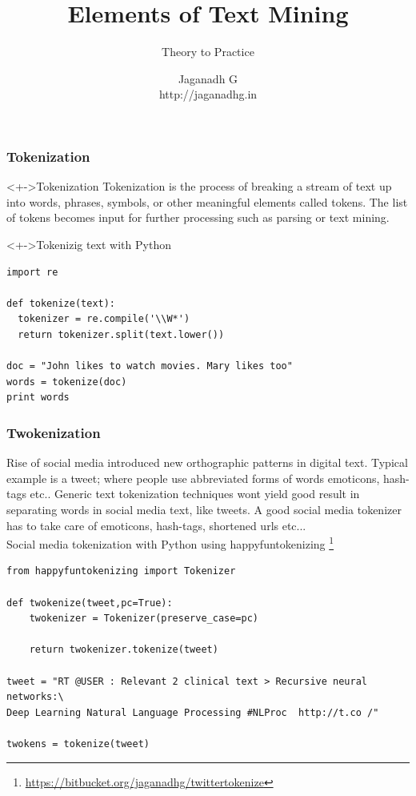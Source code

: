 \documentclass[serif,11pt,aspectratio=1610,table]{beamer}
\title {Elements of Text Mining}
\subtitle {Theory to Practice}
\author[Jaganadh G] {Jaganadh G \\ http://jaganadhg.in \\ \ccbysa}
\date {}
\begin{document}
\begin{frame}
 \maketitle
\end{frame}

\begin{frame}[fragile]
 \frametitle{Tokenization}
 \begin{block}<+->{Tokenization}
  Tokenization is the process of breaking a stream of text up into words, phrases, symbols, or other meaningful elements called tokens. The list of tokens becomes input for further processing such as parsing or text mining.
 \end{block}

\begin{block}<+->{Tokenizig text with Python}

\footnotesize
\begin{verbatim}
import re

def tokenize(text):
  tokenizer = re.compile('\\W*')
  return tokenizer.split(text.lower())

doc = "John likes to watch movies. Mary likes too"
words = tokenize(doc)
print words
\end{verbatim}

\end{block}

\end{frame}

\begin{frame}[fragile]
 \frametitle{Twokenization}
\scriptsize
Rise of social media introduced new orthographic patterns in digital text. Typical example is a tweet; where people use abbreviated forms of words emoticons, hash-tags etc.. Generic text tokenization techniques wont yield good result in separating words in social media text, like tweets. A good social media tokenizer has to take care of emoticons, hash-tags, shortened urls etc... \\
Social media tokenization with Python using happyfuntokenizing \footnote{\url{https://bitbucket.org/jaganadhg/twittertokenize}}
\footnotesize
\begin{verbatim}
from happyfuntokenizing import Tokenizer

def twokenize(tweet,pc=True):
    twokenizer = Tokenizer(preserve_case=pc)

    return twokenizer.tokenize(tweet)

tweet = "RT @USER : Relevant 2 clinical text > Recursive neural networks:\
Deep Learning Natural Language Processing #NLProc  http://t.co /"

twokens = tokenize(tweet)
\end{verbatim}

\end{frame}
\end{document}
